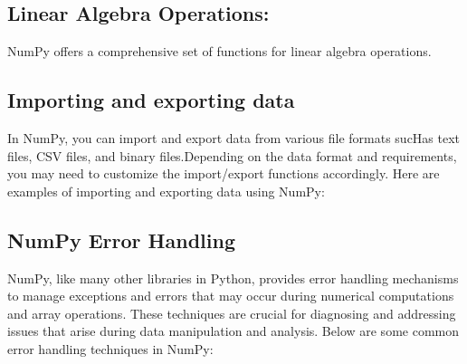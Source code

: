 \subsection{Linear Algebra Operations:}

NumPy offers a comprehensive set of functions for linear algebra operations.
\begin{code}
	[H] 
	\caption*{../Code/NumPy/NumPy.py}
	
	\caption{Linear Algebra Operations}
\end{code}

\subsection{Importing and exporting data}

In NumPy, you can import and export data from various file formats sucHas text
files, CSV files, and binary files.Depending on the data format and requirements,
you may need to customize the import/export functions accordingly. Here are
examples of importing and exporting data using NumPy:
\begin{code}
	[H] 
	\caption*{../Code/NumPy/NumPy.py}
	
	\caption{Importing and exporting data in NumPy}
\end{code}

\subsection{NumPy Error Handling}

NumPy, like many other libraries in Python, provides error handling mechanisms to
manage exceptions and errors that may occur during numerical computations and array
operations. These techniques are crucial for diagnosing and addressing issues
that arise during data manipulation and analysis. Below are some common error handling
techniques in NumPy:

